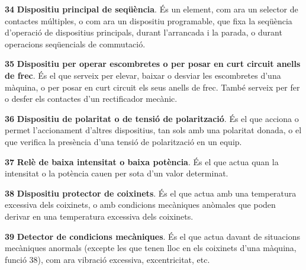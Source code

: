 \begin{multicols}{2}
\begin{list}{}
\item[\textbf{34}]  
\textbf{Dispositiu principal de
 seq\"{u}\`{e}ncia}. \'{E}s un element, com ara un selector de contactes m\'{u}ltiples, o com ara un
 dispositiu programable,
 que fixa la seq\"{u}\`{e}ncia d'operaci\'{o}
de dispositius principals, durant l'arrancada i la parada, o durant  operacions seq\"{u}encials de commutaci\'{o}.


\item[\textbf{35}]   
\textbf{Dispositiu per operar escombretes o per posar en curt
circuit anells de frec}. \'{E}s el que serveix per elevar, baixar o
desviar les escombretes d'una m\`{a}quina, o per posar en curt circuit
els seus anells de frec. Tamb\'{e} serveix per fer o desfer els
contactes d'un rectificador mec\`{a}nic.

\item[\textbf{36}] 
 
\textbf{Dispositiu de
polaritat o de tensi\'{o} de polaritzaci\'{o}}. \'{E}s el que acciona o permet
l'accionament d'altres dispositius, tan sols amb una polaritat
donada, o el que verifica la pres\`{e}ncia d'una tensi\'{o} de polaritzaci\'{o}
en un equip.

\item[\textbf{37}] 
 \textbf{Rel\`{e} de baixa
intensitat o baixa pot\`{e}ncia}. \'{E}s el que actua quan la intensitat o la pot\`{e}ncia cauen per
sota d'un valor determinat.

\item[\textbf{38}] 
\textbf{Dispositiu protector de coixinets}. \'{E}s el que actua amb una
temperatura excessiva dels coixinets, o amb condicions mec\`{a}niques
an\`{o}males que poden derivar en una temperatura excessiva dels
coixinets.

\item[\textbf{39}]  
\textbf{Detector de condicions mec\`{a}niques}. \'{E}s el que actua davant
de situacions mec\`{a}niques anormals (excepte les que tenen lloc en els
coixinets d'una m\`{a}quina, funci\'{o} 38), com ara vibraci\'{o} excessiva,
excentricitat, etc.


\end{list}
\end{multicols}
